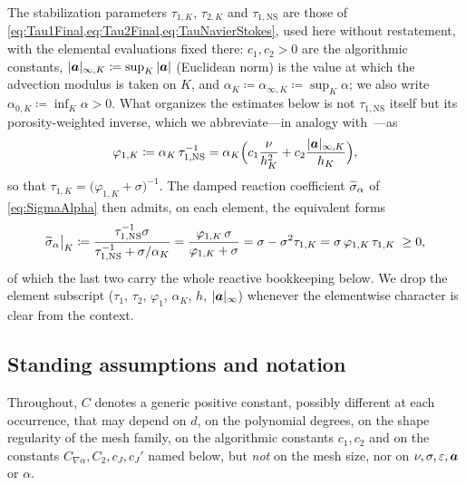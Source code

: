 The stabilization parameters $\tau_{1,K}$, $\tau_{2,K}$ and $\tau_{1,\mathrm{NS}}$ are those of
\cref{eq:Tau1Final,eq:Tau2Final,eq:TauNavierStokes}, used here without restatement, with the
elemental evaluations fixed there: $c_1,c_2>0$ are the algorithmic constants,
$|\boldsymbol{a}|_{\infty,K}\coloneqq\sup_K|\boldsymbol{a}|$ (Euclidean norm) is the value at which the advection
modulus is taken on $K$, and $\alpha_K\coloneqq\alpha_{\infty,K}\coloneqq\sup_K\alpha$; we
also write $\alpha_{0,K}\coloneqq\inf_K\alpha>0$. What organizes the estimates below is not
$\tau_{1,\mathrm{NS}}$ itself but its porosity{\hyp}weighted inverse, which we abbreviate---in
analogy with~\cite{codina2001stabilized}---as
\begin{equation}\label{eq:phi1}
  \varphi_{1,K} \coloneqq \alpha_K\,\tau_{1,\mathrm{NS}}^{-1}
  = \alpha_K\Bigl(c_1\frac{\nu}{h_K^2}+c_2\frac{|\boldsymbol{a}|_{\infty,K}}{h_K}\Bigr),
\end{equation}
so that $\tau_{1,K} = \bigl(\varphi_{1,K}+\sigma\bigr)^{-1}$. The damped reaction coefficient
$\widetilde{\sigma}_{\alpha}$ of \cref{eq:SigmaAlpha} then admits, on each element, the equivalent forms
\begin{equation}\label{eq:sigmatilde}
  \widetilde{\sigma}_{\alpha}\big|_K
  \coloneqq \frac{\tau_{1,\mathrm{NS}}^{-1}\sigma}{\tau_{1,\mathrm{NS}}^{-1}
  + \sigma/\alpha_K}
  = \frac{\varphi_{1,K}\,\sigma}{\varphi_{1,K}+\sigma}
  = \sigma - \sigma^2\tau_{1,K}
  = \sigma\,\varphi_{1,K}\,\tau_{1,K}\;\ge 0 ,
\end{equation}
of which the last two carry the whole reactive bookkeeping below. We drop the element subscript
($\tau_1$, $\tau_2$, $\varphi_1$, $\alpha_K$, $h$, $|\boldsymbol{a}|_\infty$) whenever the elementwise
character is clear from the context.

\subsection{Standing assumptions and notation}\label{sec:assumptions}
Throughout, $C$ denotes a generic positive constant, possibly different at each occurrence,
that may depend on $d$, on the polynomial degrees, on the shape regularity of the mesh
family, on the algorithmic constants $c_1,c_2$ and on the constants
$C_{\nabla\alpha},C_2,c_J,c_J'$ named below, but \emph{not} on the mesh size,
nor on $\nu,\sigma,\varepsilon,\boldsymbol{a}$ or $\alpha$.

